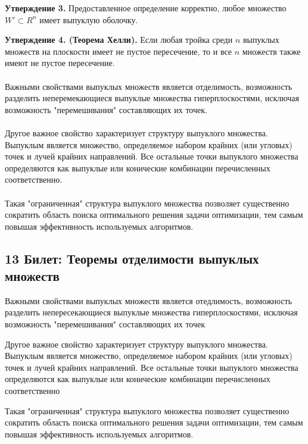 \documentclass[14pt, letterpaper]{article}
\begin{document}
\textbf{Утверждение 3.} Предоставленное определение корректно, любое множество $W\prime \subset R^{n}$ имеет выпуклую оболочку.

\textbf{Утверждение 4. (Теорема Хелли).} Если любая тройка среди $n$ выпуклых множеств на плоскости имеет не пустое пересечение, то и все $n$ множеств также имеют не пустое пересечение.
\paragraph{}
Важными свойствами выпуклых множеств является отделимость, возможность разделить неперемекающиеся выпуклые множества гиперплоскостями, исключая возможность "перемешивания" составляющих их точек.
\paragraph{}
Другое важное свойство характеризует структуру выпуклого множества. Выпуклым является множество, определяемое набором крайних (или угловых) точек и лучей крайних направлений. Все остальные точки выпуклого множества определяются как выпуклые или конические комбинации перечисленных соответственно.
\paragraph{}
Такая "ограниченная" структура выпуклого множества позволяет существенно сократить область поиска оптимального решения задачи оптимизации, тем самым повышая эффективность используемых алгоритмов.


\newpage
\subsection{13 Билет: Теоремы отделимости выпуклых множеств}

Важными свойствами выпуклых множеств является отедлимость, возможность разделить непересекающиеся выпуклые множества гиперплоскостями, исключая возможность "перемешивания" составляющих их точек

Другое важное свойство характеризует структуру выпуклого множества. Выпуклым является множество, определяемое набором крайних (или угловых) точек и лучей крайних направлений. Все остальные точки выпуклого множества определяются как выпуклые или конические комбинации перечисленных соответственно

Такая "ограниченная" структура выпуклого множества позволяет существенно сократить область поиска оптимального решения задачи оптимизации, тем самым повышая эффективность используемых алгоритмов.
\end{document}
